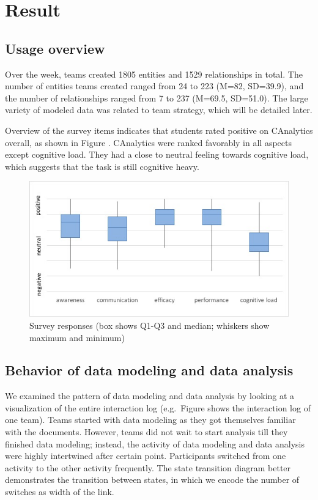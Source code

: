 \documentclass[]{article}
\date{}
\begin{document}
\section{Result}\label{result}

\subsection{Usage overview}\label{usage-overview}

Over the week, teams created 1805 entities and 1529 relationships in
total. The number of entities teams created ranged from 24 to 223 (M=82,
SD=39.9), and the number of relationships ranged from 7 to 237 (M=69.5,
SD=51.0). The large variety of modeled data was related to team
strategy, which will be detailed later.

Overview of the survey items indicates that students rated positive on
CAnalytics overall, as shown in Figure \autocite{fig:survey}. CAnalytics
were ranked favorably in all aspects except cognitive load. They had a
close to neutral feeling towards cognitive load, which suggests that the
task is still cognitive heavy.

\begin{figure}
\centering
\includegraphics{./survey/survey_boxchart.jpg}
\caption{Survey responses (box shows Q1-Q3 and median; whiskers show
maximum and minimum)}\label{fig:survey}
\end{figure}

\subsection{Behavior of data modeling and data
analysis}\label{behavior-of-data-modeling-and-data-analysis}

We examined the pattern of data modeling and data analysis by looking at
a visualization of the entire interaction log (e.g.~Figure
\autocite{fig:sequence} shows the interaction log of one team). Teams
started with data modeling as they got themselves familiar with the
documents. However, teams did not wait to start analysis till they
finished data modeling; instead, the activity of data modeling and data
analysis were highly intertwined after certain point. Participants
switched from one activity to the other activity frequently. The state
transition diagram \autocite{fig:transition} better demonstrates the
transition between states, in which we encode the number of switches as
width of the link.
\end{document}
